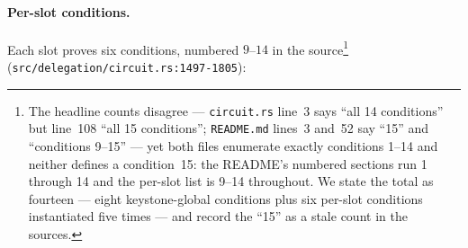 \documentclass[11pt,a4paper]{article}
\theoremstyle{definition}
\begin{document}
\paragraph{Per-slot conditions.} Each slot proves six conditions, numbered
$9$--$14$ in the source\footnote{The headline counts disagree ---
\texttt{circuit.rs} line~3 says ``all 14 conditions'' but line~108 ``all 15
conditions''; \texttt{README.md} lines~3 and~52 say ``15'' and ``conditions
9--15'' --- yet both files enumerate exactly conditions 1--14 and neither
defines a condition~15: the README's numbered sections run 1 through 14 and
the per-slot list is 9--14 throughout. We state the total as fourteen ---
eight keystone-global conditions plus six per-slot conditions instantiated
five times --- and record the ``15'' as a stale count in the sources.}
(\texttt{src/delegation/circuit.rs:1497-1805}):
\end{document}
